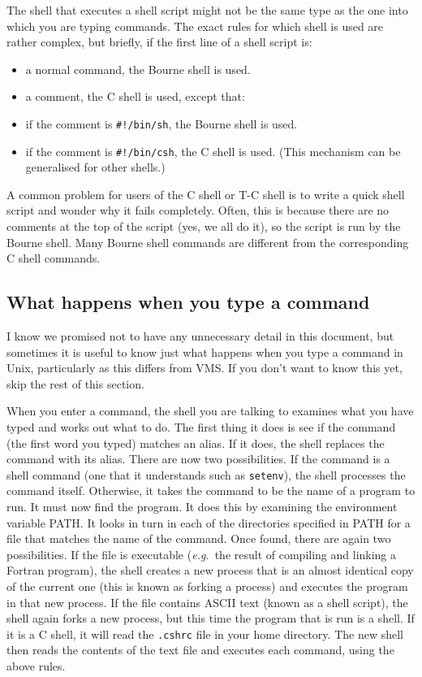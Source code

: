 The shell that executes a shell script might not be the same type as the one
into which you are typing commands.
The exact rules for which shell is used are rather complex, but briefly, if the
first line of a shell script is:
\begin{itemize}
\item a normal command, the Bourne shell is used.
\item a comment, the C shell is used, except that:
\item if the comment is {\tt \#!/bin/sh}, the Bourne shell is used.
\item if the comment is {\tt \#!/bin/csh}, the C shell is used.
(This mechanism can be generalised for other shells.)
\end{itemize}
A common problem for users of the C shell or T-C shell is to write a quick
shell script and wonder why it fails completely.
Often, this is because there are no comments at the top of the script (yes,
we all do it), so the script is run by the Bourne shell.
Many Bourne shell commands are different from the corresponding C shell
commands.

\subsection{What happens when you type a command}

I know we promised not to have any unnecessary detail in this document, but
sometimes it is useful to know just what happens when you type a command in
Unix, particularly as this differs from VMS.
If you don't want to know this yet, skip the rest of this section.

When you enter a command, the shell you are talking to examines what you have
typed and works out what to do.
The first thing it does is see if the command (the first word you typed)
matches an alias.
If it does, the shell replaces the command with its alias.
There are now two possibilities.
If the command is a shell command (one that it understands such as
{\tt setenv}), the shell processes the command itself.
Otherwise, it takes the command to be the name of a program to run.
It must now find the program.
It does this by examining the environment variable PATH.
It looks in turn in each of the directories specified in PATH for a file that
matches the name of the command.
Once found, there are again two possibilities.
If the file is executable ({\em e.g.}\, the result of compiling and linking a Fortran
program), the shell creates a new process that is an almost identical copy
of the current one (this is known as forking a process) and executes the
program in that new process.
If the file contains ASCII text (known as a shell script), the shell again
forks a new process, but this time the program that is run is a shell.
If it is a C shell, it will read the {\tt .cshrc} file in your home directory.
The new shell then reads the contents of the text file and executes each
command, using the above rules.

